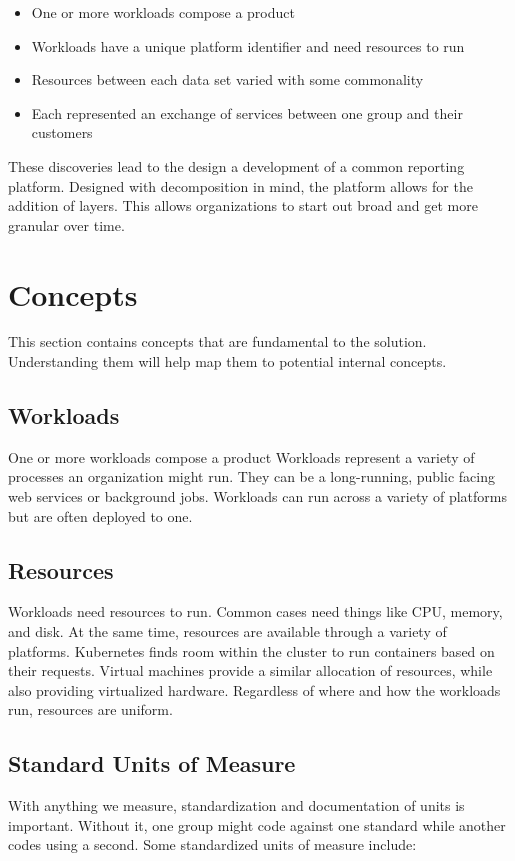 \documentclass[10pt, a4paper, twocolumn]{article}
\begin{document}
  \begin{itemize}
    \item One or more workloads compose a product
    \item Workloads have a unique platform identifier and need resources to run
    \item Resources between each data set varied with some commonality
    \item Each represented an exchange of services between one group and their customers
  \end{itemize}

  These discoveries lead to the design a development of a common reporting platform.
  Designed with decomposition in mind, the platform allows for the addition of layers.
  This allows organizations to start out broad and get more granular over time.


\section*{Concepts}
  This section contains concepts that are fundamental to the solution.
  Understanding them will help map them to potential internal concepts.

  \subsection*{Workloads}
    One or more workloads compose a product
    Workloads represent a variety of processes an organization might run.
    They can be a long-running, public facing web services or background jobs.
    Workloads can run across a variety of platforms but are often deployed to one.

  \subsection*{Resources}
    Workloads need resources to run.
    Common cases need things like CPU, memory, and disk.
    At the same time, resources are available through a variety of platforms.
    Kubernetes finds room within the cluster to run containers based on their requests.
    Virtual machines provide a similar allocation of resources, while also providing virtualized hardware.
    Regardless of where and how the workloads run, resources are uniform.

  \subsection*{Standard Units of Measure}
    With anything we measure, standardization and documentation of units is important.
    Without it, one group might code against one standard while another codes using a second.
    Some standardized units of measure include:
\end{document}

